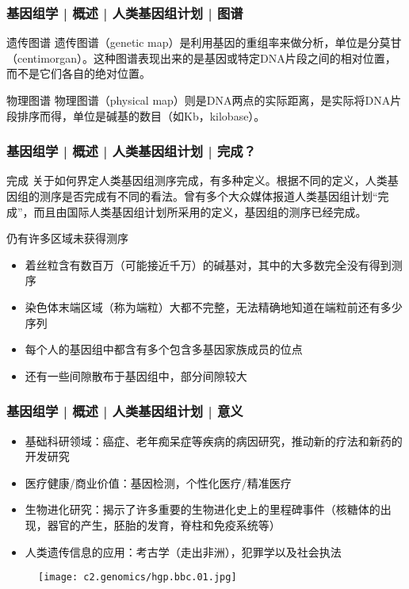\begin{frame}
  \frametitle{基因组学 | 概述 | 人类基因组计划 | 图谱}
  \begin{block}{遗传图谱}
遗传图谱（genetic map）是利用基因的重组率来做分析，单位是分莫甘（centimorgan）。这种图谱表现出来的是基因或特定DNA片段之间的相对位置，而不是它们各自的绝对位置。
  \end{block}
  \pause
  \begin{block}{物理图谱}
物理图谱（physical map）则是DNA两点的实际距离，是实际将DNA片段排序而得，单位是碱基的数目（如Kb，kilobase）。
  \end{block}
\end{frame}

\begin{frame}
  \frametitle{基因组学 | 概述 | 人类基因组计划 | 完成？}
  \begin{block}{完成}
关于如何界定人类基因组测序完成，有多种定义。根据不同的定义，人类基因组的测序是否完成有不同的看法。曾有多个大众媒体报道人类基因组计划“完成”，而且由国际人类基因组计划所采用的定义，基因组的测序已经完成。
  \end{block}
  \pause
  \begin{block}{仍有许多区域未获得测序}
    \begin{itemize}
      \item 着丝粒含有数百万（可能接近千万）的碱基对，其中的大多数完全没有得到测序
      \item 染色体末端区域（称为端粒）大都不完整，无法精确地知道在端粒前还有多少序列
      \item 每个人的基因组中都含有多个包含多基因家族成员的位点
      \item 还有一些间隙散布于基因组中，部分间隙较大
    \end{itemize}
  \end{block}
\end{frame}

\begin{frame}
  \frametitle{基因组学 | 概述 | 人类基因组计划 | 意义}
  \begin{itemize}
    \item 基础科研领域：癌症、老年痴呆症等疾病的病因研究，推动新的疗法和新药的开发研究
    \item 医疗健康/商业价值：基因检测，个性化医疗/精准医疗
    \item 生物进化研究：揭示了许多重要的生物进化史上的里程碑事件（核糖体的出现，器官的产生，胚胎的发育，脊柱和免疫系统等）
    \item 人类遗传信息的应用：考古学（走出非洲），犯罪学以及社会执法
  \end{itemize}
  \begin{figure}
    \centering
    \texttt{[image: c2.genomics/hgp.bbc.01.jpg]}
  \end{figure}
\end{frame}

